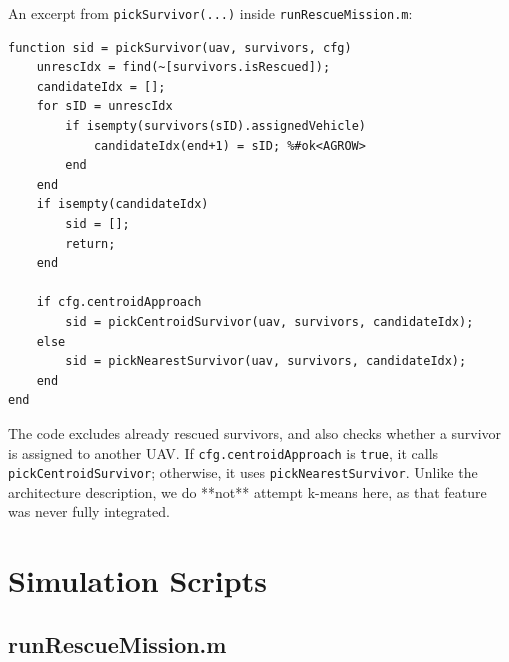\documentclass[12pt,a4paper]{report}
\begin{document}
An excerpt from \texttt{pickSurvivor(...)} inside \texttt{runRescueMission.m}:
\begin{verbatim}
function sid = pickSurvivor(uav, survivors, cfg)
    unrescIdx = find(~[survivors.isRescued]);
    candidateIdx = [];
    for sID = unrescIdx
        if isempty(survivors(sID).assignedVehicle)
            candidateIdx(end+1) = sID; %#ok<AGROW>
        end
    end
    if isempty(candidateIdx)
        sid = [];
        return;
    end

    if cfg.centroidApproach
        sid = pickCentroidSurvivor(uav, survivors, candidateIdx);
    else
        sid = pickNearestSurvivor(uav, survivors, candidateIdx);
    end
end
\end{verbatim}
The code excludes already rescued survivors, and also checks whether a survivor is 
assigned to another UAV. If \texttt{cfg.centroidApproach} is \texttt{true}, it calls 
\texttt{pickCentroidSurvivor}; otherwise, it uses \texttt{pickNearestSurvivor}. 
Unlike the architecture description, we do **not** attempt k-means here, as that feature 
was never fully integrated.

\section{Simulation Scripts}
\label{sec:simulation_scripts}

\subsection{runRescueMission.m}
\label{sec:run_rescue_mission}
\end{document}
